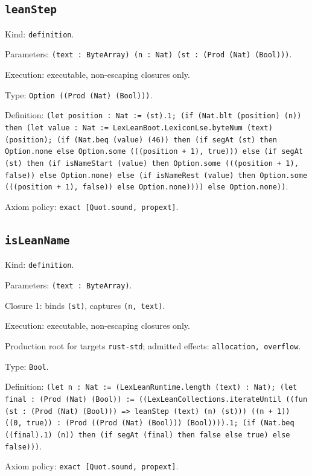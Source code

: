 \documentclass[11pt]{article}
\begin{document}
\subsection*{\texttt{leanStep}}
\noindent Kind: \texttt{definition}.\par
\noindent Parameters: \texttt{(text : ByteArray) (n : Nat) (st : (Prod (Nat) (Bool)))}.\par
\noindent Execution: executable, non-escaping closures only.\par
\noindent Type: \texttt{Option ((Prod (Nat) (Bool)))}.\par
\noindent Definition: \texttt{(let position : Nat := (st).1; (if (Nat.blt (position) (n)) then (let value : Nat := LexLeanBoot.LexiconLse.byteNum (text) (position); (if (Nat.beq (value) (46)) then (if segAt (st) then Option.none else Option.some (((position + 1), true))) else (if segAt (st) then (if isNameStart (value) then Option.some (((position + 1), false)) else Option.none) else (if isNameRest (value) then Option.some (((position + 1), false)) else Option.none)))) else Option.none))}.\par
\noindent Axiom policy: \texttt{exact [Quot.sound, propext]}.\par
\subsection*{\texttt{isLeanName}}
\noindent Kind: \texttt{definition}.\par
\noindent Parameters: \texttt{(text : ByteArray)}.\par
\noindent Closure 1: binds \texttt{(st)}, captures \texttt{(n, text)}.\par
\noindent Execution: executable, non-escaping closures only.\par
\noindent Production root for targets \texttt{rust-std}; admitted effects: \texttt{allocation, overflow}.\par
\noindent Type: \texttt{Bool}.\par
\noindent Definition: \texttt{(let n : Nat := (LexLeanRuntime.length (text) : Nat); (let final : (Prod (Nat) (Bool)) := ((LexLeanCollections.iterateUntil ((fun (st : (Prod (Nat) (Bool))) => leanStep (text) (n) (st))) ((n + 1)) ((0, true)) : (Prod ((Prod (Nat) (Bool))) (Bool)))).1; (if (Nat.beq ((final).1) (n)) then (if segAt (final) then false else true) else false)))}.\par
\noindent Axiom policy: \texttt{exact [Quot.sound, propext]}.\par
\end{document}
